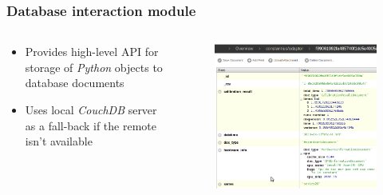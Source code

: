 \documentclass{beamer}
\begin{document}
\begin{frame}
\frametitle{Database interaction module}

	\begin{columns}[T]
		\begin{column}{0.5\textwidth}
			\begin{itemize}
				\item Provides high-level API for storage of \textit{Python} objects to database documents
				\item Uses local \textit{CouchDB} server as a fall-back if the remote isn't available
			\end{itemize}
		\end{column}
		\begin{column}{0.5\textwidth}
			\begin{figure}
				\includegraphics[width=\textwidth]{database-interaction}
			\end{figure}
		\end{column}
	\end{columns}
	
\end{frame}
\end{document}
